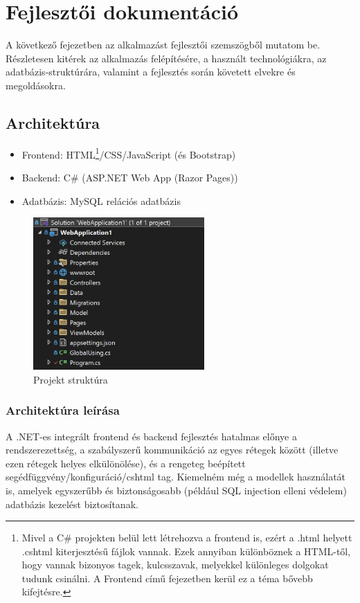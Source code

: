 \chapter{Fejlesztői dokumentáció}
\label{ch:impl}
 A következő fejezetben az alkalmazást fejlesztői szemszögből mutatom be. Részletesen kitérek az alkalmazás felépítésére, a használt technológiákra, az adatbázis-struktúrára, valamint a fejlesztés során követett elvekre és megoldásokra.

\section{Architektúra}
\begin{itemize}
	\item Frontend: HTML\footnote{Mivel a C\# projekten
		belül lett létrehozva a frontend is, ezért a .html helyett .cshtml
		kiterjesztésű fájlok vannak. Ezek annyiban különböznek a 
		HTML-től, hogy vannak bizonyos tagek, kulcsszavak, melyekkel
		különleges dolgokat tudunk csinálni. A Frontend című fejezetben kerül ez a téma bővebb kifejtésre.}/CSS/JavaScript (és Bootstrap)
	\item Backend: C\# (ASP.NET Web App (Razor Pages))
	\item Adatbázis: MySQL relációs adatbázis
\end{itemize}

\begin{figure}[H]
	\centering
	\includegraphics[height=220px]{img/solution-explorer-screenshot}
	\caption{Projekt struktúra}
	\label{fig:project-structure}
\end{figure}

\subsection{Architektúra leírása}
A .NET-es integrált frontend és backend fejlesztés hatalmas előnye a rendszerezettség, a szabályszerű kommunikáció az egyes rétegek között (illetve ezen rétegek helyes elkülönölése), és a rengeteg beépített segédfüggvény/konfiguráció/cshtml tag. Kiemelném még a modellek használatát is, amelyek egyszerűbb és biztonságosabb (például SQL injection elleni védelem) adatbázis kezelést biztosítanak.

